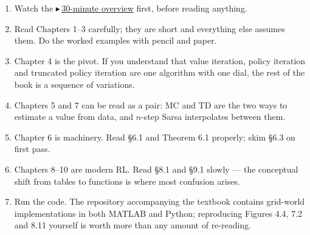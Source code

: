 \documentclass[11pt, letterpaper]{article}
\theoremstyle{runin}
\theoremstyle{runinplain}
\theoremstyle{remark}
\newcommand{\vid}[2]{{\color{vidred}\small$\playbutton$\,\href{#2}{\textsf{#1}}}}
\newcommand{\playbutton}{\blacktriangleright}
\begin{document}
\begin{enumerate}
  \item Watch the \vid{30-minute overview}{https://www.youtube.com/watch?v=ZHMWHr9811U}
        first, before reading anything.
  \item Read Chapters 1--3 carefully; they are short and everything else assumes them.
        Do the worked examples with pencil and paper.
  \item Chapter 4 is the pivot. If you understand that value iteration, policy
        iteration and truncated policy iteration are one algorithm with one dial,
        the rest of the book is a sequence of variations.
  \item Chapters 5 and 7 can be read as a pair: MC and TD are the two ways to
        estimate a value from data, and $n$-step Sarsa interpolates between them.
  \item Chapter 6 is machinery. Read \S6.1 and Theorem 6.1 properly; skim \S6.3 on
        first pass.
  \item Chapters 8--10 are modern RL. Read \S8.1 and \S9.1 slowly --- the conceptual
        shift from tables to functions is where most confusion arises.
  \item Run the code. The repository accompanying the textbook contains grid-world
        implementations in both MATLAB and Python; reproducing Figures 4.4, 7.2 and
        8.11 yourself is worth more than any amount of re-reading.
\end{enumerate}
\end{document}
